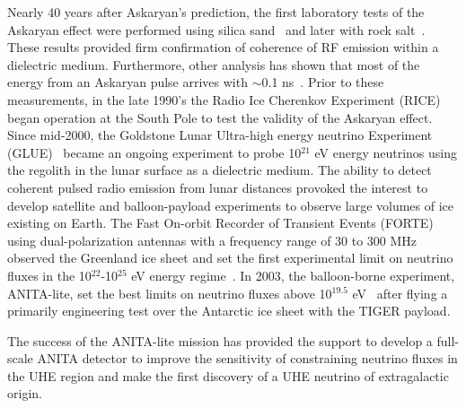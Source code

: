 \par Nearly 40 years after Askaryan's prediction, the first laboratory tests of the Ask\-ar\-yan effect were performed using silica sand~\cite{Gorham.2000} and later with rock salt~\cite{Gorham.2005}.  These results provided firm confirmation of coherence of RF emission within a dielectric medium.  Furthermore, other analysis has shown that most of the energy from an Askaryan pulse arrives with $\sim$0.1 ns~\cite{Miocinovic.2006}.  Prior to these measurements, in the late 1990's the Radio Ice Cherenkov Experiment (RICE)~\cite{RICE.2003} began operation at the South Pole to test the validity of the Askaryan effect.  Since mid-2000, the Goldstone Lunar Ultra-high energy neutrino Experiment (GLUE)~\cite{GLUE.2004} became an ongoing experiment to probe 10$^{21}$ eV energy neutrinos using the regolith in the lunar surface as a dielectric medium.  The ability to detect coherent pulsed radio emission from lunar distances provoked the interest to develop satellite and balloon-payload experiments to observe large volumes of ice existing on Earth.  The Fast On-orbit Recorder of Transient Events (FORTE) using dual-polarization antennas with a frequency range of 30 to 300 MHz observed the Greenland ice sheet and set the first experimental limit on neutrino fluxes in the 10$^{22}$-10$^{25}$ eV energy regime~\cite{FORTE.2004}.  In 2003, the balloon-borne experiment, ANITA-lite, set the best limits on neutrino fluxes above 10$^{19.5}$ eV~\cite{ANITA.2006} after flying a primarily engineering test over the Antarctic ice sheet with the TIGER payload.

\par The success of the ANITA-lite mission has provided the support to develop a full-scale ANITA detector to improve the sensitivity of constraining neutrino fluxes in the UHE region and make the first discovery of a UHE neutrino of extragalactic origin.